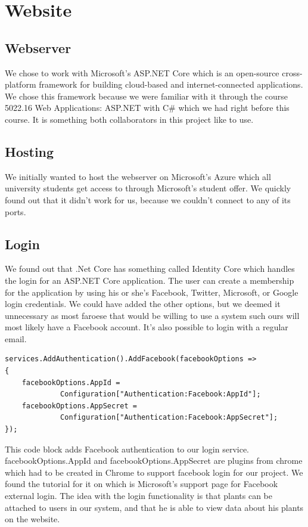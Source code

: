 \documentclass[a4paper,12pt,oneside,openright,titlepage]{book}
\begin{document}
\chapter{Website}
\section*{Webserver}
We chose to work with Microsoft's ASP.NET Core which is an open-source cross-platform framework for building cloud-based and internet-connected applications. We chose this framework because we were familiar with it through the course 5022.16 Web Applications: ASP.NET with C\# which we had right before this course. It is something both collaborators in this project like to use. 

\section{Hosting}
We initially wanted to host the webserver on Microsoft's Azure which all university students get access to through Microsoft's student offer. We quickly found out that it didn't work for us, because we couldn't connect to any of its ports. 

\section{Login}
We found out that .Net Core has something called Identity Core\cite{Identity} which handles the login for an ASP.NET Core application. The user can create a membership for the application by using his or she's Facebook, Twitter, Microsoft, or Google login credentials. We could have added the other options, but we deemed it unnecessary as most faroese that would be willing to use a system such ours will most likely have a Facebook account. It's also possible to login with a regular email.

\begin{lstlisting}[language=CSharp] 
services.AddAuthentication().AddFacebook(facebookOptions =>
{
	facebookOptions.AppId =
			 Configuration["Authentication:Facebook:AppId"];
	facebookOptions.AppSecret =
			 Configuration["Authentication:Facebook:AppSecret"];
});
\end{lstlisting}

This code block adds Facebook authentication to our login service. facebookOptions.AppId and facebookOptions.AppSecret are plugins from chrome which had to be created in Chrome to support facebook login for our project. We found the tutorial for it on \cite{FacebookLogin} which is Microsoft's support page for Facebook external login. The idea with the login functionality is that plants can be attached to users in our system, and that he is able to view data about his plants on the website.
\end{document}
